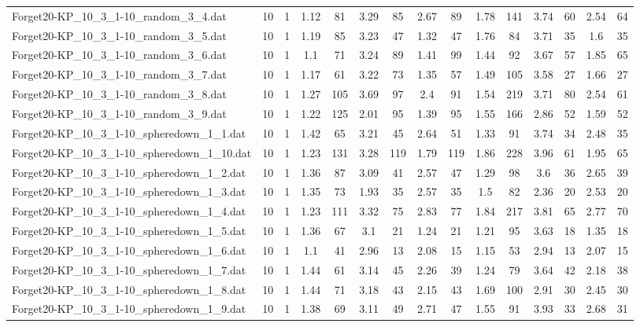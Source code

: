 \begin{table}[!ht]
{\begin{tabular}{lcccccccccccccc}
Forget20-KP\_10\_3\_1-10\_random\_3\_4.dat & 10 & 1 & 1.12 & 81 & 3.29 & 85 & 2.67 & 89 & 1.78 & 141 & 3.74 & 60 & 2.54 & 64 \\
Forget20-KP\_10\_3\_1-10\_random\_3\_5.dat & 10 & 1 & 1.19 & 85 & 3.23 & 47 & 1.32 & 47 & 1.76 & 84 & 3.71 & 35 & 1.6 & 35 \\
Forget20-KP\_10\_3\_1-10\_random\_3\_6.dat & 10 & 1 & 1.1 & 71 & 3.24 & 89 & 1.41 & 99 & 1.44 & 92 & 3.67 & 57 & 1.85 & 65 \\
Forget20-KP\_10\_3\_1-10\_random\_3\_7.dat & 10 & 1 & 1.17 & 61 & 3.22 & 73 & 1.35 & 57 & 1.49 & 105 & 3.58 & 27 & 1.66 & 27 \\
Forget20-KP\_10\_3\_1-10\_random\_3\_8.dat & 10 & 1 & 1.27 & 105 & 3.69 & 97 & 2.4 & 91 & 1.54 & 219 & 3.71 & 80 & 2.54 & 61 \\
Forget20-KP\_10\_3\_1-10\_random\_3\_9.dat & 10 & 1 & 1.22 & 125 & 2.01 & 95 & 1.39 & 95 & 1.55 & 166 & 2.86 & 52 & 1.59 & 52 \\
Forget20-KP\_10\_3\_1-10\_spheredown\_1\_1.dat & 10 & 1 & 1.42 & 65 & 3.21 & 45 & 2.64 & 51 & 1.33 & 91 & 3.74 & 34 & 2.48 & 35 \\
Forget20-KP\_10\_3\_1-10\_spheredown\_1\_10.dat & 10 & 1 & 1.23 & 131 & 3.28 & 119 & 1.79 & 119 & 1.86 & 228 & 3.96 & 61 & 1.95 & 65 \\
Forget20-KP\_10\_3\_1-10\_spheredown\_1\_2.dat & 10 & 1 & 1.36 & 87 & 3.09 & 41 & 2.57 & 47 & 1.29 & 98 & 3.6 & 36 & 2.65 & 39 \\
Forget20-KP\_10\_3\_1-10\_spheredown\_1\_3.dat & 10 & 1 & 1.35 & 73 & 1.93 & 35 & 2.57 & 35 & 1.5 & 82 & 2.36 & 20 & 2.53 & 20 \\
Forget20-KP\_10\_3\_1-10\_spheredown\_1\_4.dat & 10 & 1 & 1.23 & 111 & 3.32 & 75 & 2.83 & 77 & 1.84 & 217 & 3.81 & 65 & 2.77 & 70 \\
Forget20-KP\_10\_3\_1-10\_spheredown\_1\_5.dat & 10 & 1 & 1.36 & 67 & 3.1 & 21 & 1.24 & 21 & 1.21 & 95 & 3.63 & 18 & 1.35 & 18 \\
Forget20-KP\_10\_3\_1-10\_spheredown\_1\_6.dat & 10 & 1 & 1.1 & 41 & 2.96 & 13 & 2.08 & 15 & 1.15 & 53 & 2.94 & 13 & 2.07 & 15 \\
Forget20-KP\_10\_3\_1-10\_spheredown\_1\_7.dat & 10 & 1 & 1.44 & 61 & 3.14 & 45 & 2.26 & 39 & 1.24 & 79 & 3.64 & 42 & 2.18 & 38 \\
Forget20-KP\_10\_3\_1-10\_spheredown\_1\_8.dat & 10 & 1 & 1.44 & 71 & 3.18 & 43 & 2.15 & 43 & 1.69 & 100 & 2.91 & 30 & 2.45 & 30 \\
Forget20-KP\_10\_3\_1-10\_spheredown\_1\_9.dat & 10 & 1 & 1.38 & 69 & 3.11 & 49 & 2.71 & 47 & 1.55 & 91 & 3.93 & 33 & 2.68 & 31 \\

\end{tabular}}
\end{table}
